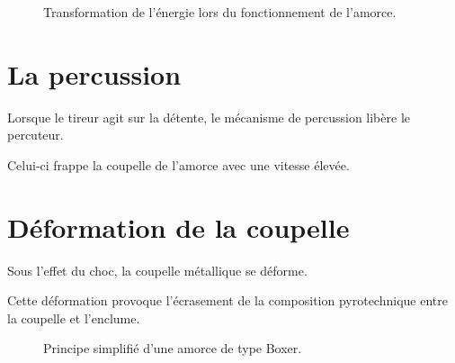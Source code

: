 \begin{figure}[htbp]
\centering


\caption{Transformation de l'énergie lors du fonctionnement de l'amorce.}
\label{fig:chaine_energetique_amorce}

\end{figure}

\section{La percussion}

Lorsque le tireur agit sur la détente, le mécanisme de percussion libère le
percuteur.

Celui-ci frappe la coupelle de l'amorce avec une vitesse élevée.

\section{Déformation de la coupelle}

Sous l'effet du choc, la coupelle métallique se déforme.

Cette déformation provoque l'écrasement de la composition pyrotechnique entre
la coupelle et l'enclume.

\begin{figure}[htbp]
\centering


\caption{Principe simplifié d'une amorce de type Boxer.}
\label{fig:amorce_boxer_simplifiee}

\end{figure}

